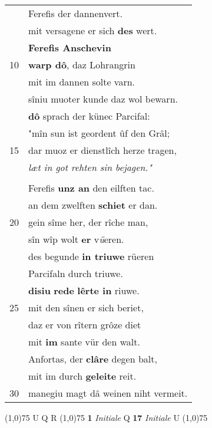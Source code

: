 \documentclass[8pt,a4paper,notitlepage]{article}
\begin{document}
\begin{table}[ht]
\begin{minipage}[t]{0.5\linewidth}
\begin{tabular}{rl}
 & Ferefis der dannenvert.\\ 
 & mit versagene er sich \textbf{des} wert.\\ 
 & \textbf{Ferefis Anschevin}\\ 
10 & \textbf{warp dô}, daz Lohrangrin\\ 
 & mit im dannen solte varn.\\ 
 & sîniu muoter kunde daz wol bewarn.\\ 
 & \textbf{dô} sprach der künec Parcifal:\\ 
 & "mîn sun ist geordent ûf den Grâl;\\ 
15 & dar muoz er dienstlîch herze tragen,\\ 
 & \textit{læt in got rehten sin bejagen."}\\ 
 & \textbf{\begin{large}M\end{large}inne} und kurzewîle pflac\\ 
 & Ferefis \textbf{unz an} den eilften tac.\\ 
 & an dem zwelften \textbf{schiet} er dan.\\ 
20 & gein sîme her, der rîche man,\\ 
 & sîn wîp wolt \textbf{er} v\textit{ü}eren.\\ 
 & des begunde \textbf{in triuwe} rüeren\\ 
 & Parcifaln durch triuwe.\\ 
 & \textbf{disiu} \textbf{rede} \textbf{lêrte in} riuwe.\\ 
25 & mit den sînen er sich beriet,\\ 
 & daz er von rîtern grôze diet\\ 
 & mit \textbf{im} sante vür den walt.\\ 
 & Anfortas, der \textbf{clâre} degen balt,\\ 
 & mit im durch \textbf{geleite} reit.\\ 
30 & manegiu magt dâ weinen niht vermeit.\\ 
\end{tabular}
\scriptsize
\line(1,0){75} \newline
U Q R \newline
\line(1,0){75} \newline
\textbf{1} \textit{Initiale} Q  \textbf{17} \textit{Initiale} U  \newline
\line(1,0){75} \newline

\end{minipage}
\end{table}
\end{document}
